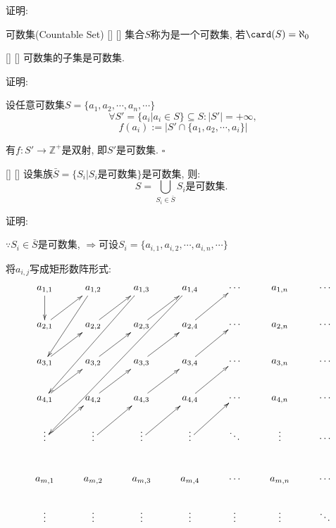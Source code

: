 \documentclass[UTF8]{ctexart}
\begin{document}
    证明: 

			
			\begin{dfn}
				[]
				{可数集(Countable Set)}
				[]
				[]
                集合$S$称为是一个可数集, 若$\card(S)=\aleph_0$
			\end{dfn}
				
			\begin{ppt}
                []
                {}
                []
                []
				可数集的子集是可数集. 
			\end{ppt}
			
			证明: 
				
				设任意可数集$S=\{a_1,a_2,\cdots,a_n,\cdots\}$
				\[\forall S'=\{a_i|a_i\in S\}\subseteq S: |S'|=+\infty, \]
				\[f(a_i):=|S'\cap\{a_1,a_2,\cdots,a_i\}|\]
				
				有$f:S'\to\mathbb{Z}^+$是双射, 即$S'$是可数集. $\square$
			
			\begin{thm}
                []
                {}
                []
                []
				设集族$\bar S=\{S_i|S_i\mbox{是可数集}\}$是可数集, 则: 
				\[S=\bigcup_{S_i\in \bar S}S_i\mbox{是可数集. }\]
			\end{thm}
			
			证明: 
				
				$\because S_i\in\bar S$是可数集, $\Longrightarrow$可设$S_i=\{a_{i,1},a_{i,2},\cdots, a_{i,n},\cdots\}$
				
				将$a_{i,j}$写成矩形数阵形式: 
				\[\begin{matrix}
				\xymatrix{
				a_{1,1}\ar[d] & a_{1,2}\ar[ddl] & a_{1,3}\ar[dddll] & a_{1,4}\ar[ddddlll] & \cdots & a_{1,n} & \cdots\\
				a_{2,1}\ar[ur] & a_{2,2}\ar[ur] & a_{2,3}\ar[ur] & a_{2,4}\ar[ur] & \cdots & a_{2,n}& \cdots\\
				a_{3,1}\ar[ur] & a_{3,2}\ar[ur] & a_{3,3}\ar[ur] & a_{3,4}\ar[ur] & \cdots & a_{3,n}& \cdots\\
				a_{4,1}\ar[ur] & a_{4,2}\ar[ur] & a_{4,3}\ar[ur] & a_{4,4}\ar[ur] & \cdots & a_{4,n}& \cdots\\
				\vdots\ar[ur] & \vdots\ar[ur] & \vdots\ar[ur] & \vdots\ar[ur] & \ddots & \vdots & \cdots\\
				a_{m,1} & a_{m,2} & a_{m,3} & a_{m,4} & \cdots & a_{m,n} & \cdots\\
				\vdots & \vdots & \vdots & \vdots & \vdots & \vdots & \ddots
				}
				\end{matrix}\]
				
\end{document}
